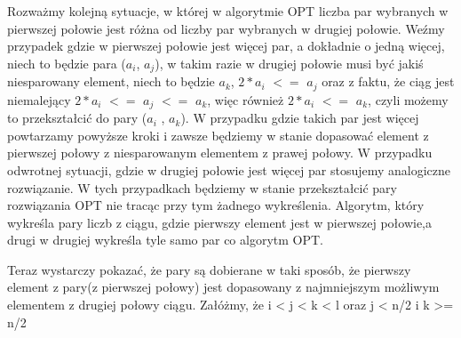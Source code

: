 \documentclass[a4paper,10pt]{article}
\begin{document}
Rozważmy kolejną sytuacje, w której w algorytmie OPT liczba par wybranych w pierwszej połowie jest różna od liczby par wybranych w drugiej połowie. \newline
Weźmy przypadek gdzie w pierwszej połowie jest więcej par, a dokładnie o jedną więcej, niech to będzie para ($a_i$, $a_j$),  w takim razie w drugiej połowie musi być jakiś niesparowany element, niech to będzie $a_k$, $2*a_i$  $<=$ $a_j$ oraz z faktu, że ciąg jest niemalejący $2*a_i$  $<=$ $a_j$ $<=$ $a_k$, więc również $2*a_i$  $<=$ $a_k$, czyli możemy to przekształcić do pary ($a_i$ , $a_k$). W przypadku gdzie takich par jest więcej powtarzamy powyższe kroki i zawsze będziemy w stanie dopasować element z pierwszej połowy z niesparowanym elementem z prawej połowy. W przypadku odwrotnej sytuacji, gdzie w drugiej połowie jest więcej par stosujemy analogiczne rozwiązanie. W tych przypadkach będziemy w stanie przekształcić pary rozwiązania OPT nie tracąc przy tym żadnego wykreślenia. Algorytm, który wykreśla pary liczb z ciągu, gdzie pierwszy element jest w pierwszej połowie,a  drugi w drugiej wykreśla tyle samo par co algorytm OPT. 
\begin{flushright}
\qedsymbol 
\end{flushright}
Teraz wystarczy pokazać, że pary są dobierane w taki sposób, że pierwszy element z pary(z pierwszej połowy) jest dopasowany z najmniejszym możliwym elementem z drugiej połowy ciągu. \newline
Załóżmy, że  i < j < k < l  oraz j < n/2 i k >= n/2 \newline
\end{document}
